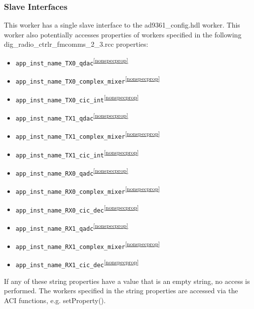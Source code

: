 \documentclass{article}
\def\comp{dig\_radio\_ctrlr\_fmcomms\_2\_3}
\begin{document}
    \subsubsection{Slave Interfaces}
      This worker has a single slave interface to the ad9361\_config.hdl worker.
      This worker also potentially accesses properties of workers specified in
      the following \comp.rcc properties:
      \begin{itemize}
        \item \verb+app_inst_name_TX0_qdac+\textsuperscript{\ref{nonspecprop}}
        \item \verb+app_inst_name_TX0_complex_mixer+\textsuperscript{\ref{nonspecprop}}
        \item \verb+app_inst_name_TX0_cic_int+\textsuperscript{\ref{nonspecprop}}
        \item \verb+app_inst_name_TX1_qdac+\textsuperscript{\ref{nonspecprop}}
        \item \verb+app_inst_name_TX1_complex_mixer+\textsuperscript{\ref{nonspecprop}}
        \item \verb+app_inst_name_TX1_cic_int+\textsuperscript{\ref{nonspecprop}}
        \item \verb+app_inst_name_RX0_qadc+\textsuperscript{\ref{nonspecprop}}
        \item \verb+app_inst_name_RX0_complex_mixer+\textsuperscript{\ref{nonspecprop}}
        \item \verb+app_inst_name_RX0_cic_dec+\textsuperscript{\ref{nonspecprop}}
        \item \verb+app_inst_name_RX1_qadc+\textsuperscript{\ref{nonspecprop}}
        \item \verb+app_inst_name_RX1_complex_mixer+\textsuperscript{\ref{nonspecprop}}
        \item \verb+app_inst_name_RX1_cic_dec+\textsuperscript{\ref{nonspecprop}}
      \end{itemize}
      If any of these string properties have a value that is an empty string,
      no access is performed.
      The workers specified in the string properties are accessed via the ACI
      functions\cite{ocpi_app_guide}, e.g. setProperty().
\end{document}
